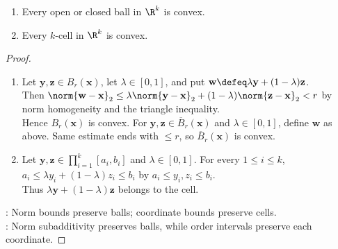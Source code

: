 \begin{proposition} \label{prop:balls-and-cells-convex} 
\begin{enumerate}[label=(\roman*)]
\setlength{\itemsep}{0pt}
\item Every open or closed ball in $\R^k$ is convex.
\item Every $k$-cell in $\R^k$ is convex.
\end{enumerate}
\begin{proof}
\begin{enumerate}[label=(\roman*)]
\setlength{\itemsep}{0pt}
\item Let $\mathbf{y},\mathbf{z}\in B_r(\mathbf{x})$, let $\lambda\in[0,1]$, and put $\mathbf{w}\defeq\lambda\mathbf{y}+(1-\lambda)\mathbf{z}$.\\
Then $\norm{\mathbf{w}-\mathbf{x}}_2\leq\lambda\norm{\mathbf{y}-\mathbf{x}}_2+(1-\lambda)\norm{\mathbf{z}-\mathbf{x}}_2<r$ by norm homogeneity and the triangle inequality.\\
Hence $B_r(\mathbf{x})$ is convex. For $\mathbf{y},\mathbf{z}\in\overline{B}_r(\mathbf{x})$ and $\lambda\in[0,1]$, define $\mathbf{w}$ as above. Same estimate ends with $\leq r$, so $\overline{B}_r(\mathbf{x})$ is convex.
\item Let $\mathbf{y},\mathbf{z}\in\prod\limits_{i=1}^{k}[a_i,b_i]$ and $\lambda\in[0,1]$. For every $1\leq i\leq k$, $a_i\leq\lambda y_i+(1-\lambda)z_i\leq b_i$ by $a_i\leq y_i,z_i\leq b_i$.\\
Thus $\lambda\mathbf{y}+(1-\lambda)\mathbf{z}$ belongs to the cell.
\end{enumerate}
: Norm bounds preserve balls; coordinate bounds preserve cells.\\
: Norm subadditivity preserves balls, while order intervals preserve each coordinate.
\end{proof}
\end{proposition}

